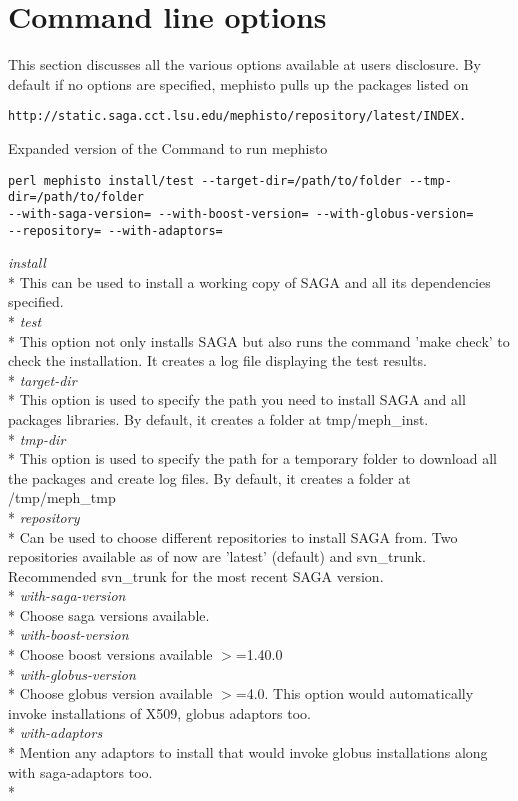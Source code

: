 \documentclass[a4paper,10pt]{article}
\begin{document}
\section*{Command line options}
This section discusses all the various options available at 
users disclosure. By default if no options are specified, mephisto 
pulls up the packages listed on
\begin{verbatim} 
http://static.saga.cct.lsu.edu/mephisto/repository/latest/INDEX. 
\end{verbatim}
Expanded version of the Command to run mephisto
\begin{verbatim} 
perl mephisto install/test --target-dir=/path/to/folder --tmp-dir=/path/to/folder 
--with-saga-version= --with-boost-version= --with-globus-version= 
--repository= --with-adaptors= 
\end{verbatim} 
\emph{install} \\*
 This can be used to install a working copy of SAGA and all its 
 dependencies specified. \\*
\emph{test} \\*
 This option not only installs SAGA but also runs the command 
 'make check' to check the installation. It creates a log file displaying 
 the test results. \\*
\emph{target-dir} \\*
 This option is used to specify the path you need to install SAGA and all 
 packages libraries. By default, it creates a folder at tmp/meph\_inst.\\*
\emph{tmp-dir} \\*
 This option is used to specify the path for a temporary folder to 
 download all the packages and create log files. By default, it 
 creates a folder at /tmp/meph\_tmp\\*
\emph{repository} \\*
 Can be used to choose different repositories to install SAGA from. 
 Two repositories available as of now are 'latest' (default) and svn\_trunk. 
 Recommended svn\_trunk for the most recent SAGA version. \\*
\emph{with-saga-version}\\*
 Choose saga versions available.\\*
\emph{with-boost-version}\\*
Choose boost versions available $>$=1.40.0\\*
\emph{with-globus-version} \\*
 Choose globus version available $>$=4.0. This option would automatically 
 invoke installations of X509, globus adaptors too. \\*
\emph{with-adaptors}\\*
 Mention any adaptors to install that would invoke globus installations along with 
 saga-adaptors too. \\*
\end{document}
